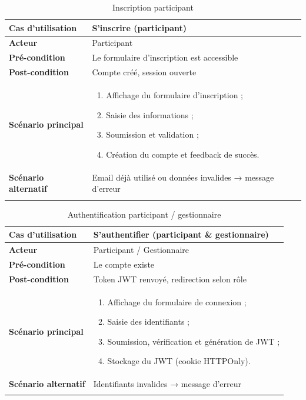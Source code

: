 \begin{longtable}{|>{\bfseries}p{4cm}|p{10cm}|}
\hline
Cas d'utilisation & S’inscrire (participant) \\
\hline
Acteur & Participant \\
\hline
Pré-condition & Le formulaire d’inscription est accessible \\
\hline
Post-condition & Compte créé, session ouverte \\
\hline
Scénario principal &
\begin{enumerate}
  \item Affichage du formulaire d’inscription ;
  \item Saisie des informations ;
  \item Soumission et validation ;
  \item Création du compte et feedback de succès.
\end{enumerate} \\
\hline
Scénario alternatif & Email déjà utilisé ou données invalides → message d’erreur \\
\hline
\caption{Inscription participant}
\end{longtable}

\begin{longtable}{|>{\bfseries}p{4cm}|p{10cm}|}
\hline
Cas d'utilisation & S’authentifier (participant \& gestionnaire) \\
\hline
Acteur & Participant / Gestionnaire \\
\hline
Pré-condition & Le compte existe \\
\hline
Post-condition & Token JWT renvoyé, redirection selon rôle \\
\hline
Scénario principal &
\begin{enumerate}
  \item Affichage du formulaire de connexion ;
  \item Saisie des identifiants ;
  \item Soumission, vérification et génération de JWT ;
  \item Stockage du JWT (cookie HTTPOnly).
\end{enumerate} \\
\hline
Scénario alternatif & Identifiants invalides → message d’erreur \\
\hline
\caption{Authentification participant / gestionnaire}
\end{longtable}


